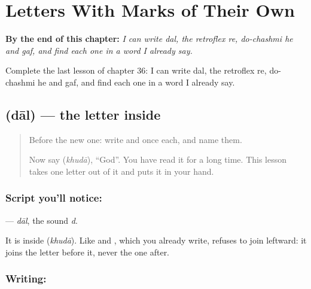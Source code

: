 
\chapter{Letters With Marks of Their Own}
\label{ch:ur-letters-marks-of-their-own}

\begin{chapteropening}
\textbf{By the end of this chapter:} \emph{I can write dal, the retroflex re, do-chashmi he and gaf, and find each one in a word I already say.}

Complete the last lesson of chapter 36: I can write dal, the retroflex re, do-chashmi he and gaf, and find each one in a word I already say.
\end{chapteropening}

\section[\texorpdfstring{\ur{د} (dāl)}{د (dāl)}]{ (dāl) — the letter inside }

\label{lesson:UR-W36-dal}



\begin{quote}
Before the new one: write  and  once each, and name them.

Now say \textbf{} (\emph{khudā}), \textquotedblleft{}God\textquotedblright{}. You have read it for a long time. This lesson takes one letter out of it and puts it in your hand.
\end{quote}

\subsection*{Script you'll notice: }
\textbf{} — \emph{dāl}, the sound \emph{d}.

It is inside \textbf{} (\emph{khudā}). Like \textbf{} and \textbf{}, which you already write, \textbf{} refuses to join leftward: it joins the letter before it, never the one after.

\subsection*{Writing: }


